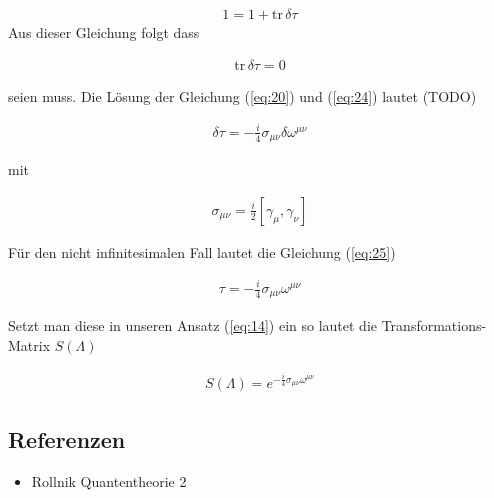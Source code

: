 \begin{align}
  \label{eq:23}
  1 =  1 + \text{tr}\,\delta\tau 
\end{align}
Aus dieser Gleichung folgt dass

\begin{align}
  \label{eq:24}
  \text{tr}\,\delta\tau = 0
\end{align}

seien muss. Die Lösung der Gleichung (\ref{eq:20}) und (\ref{eq:24}) lautet (TODO)

\begin{align}
  \label{eq:25}
  \delta\tau = -\frac{i}{4}\sigma_{\mu\nu}\delta\omega^{\mu\nu}
\end{align}

mit

\begin{align}
  \label{eq:26}
  \sigma_{\mu\nu} = \frac{i}{2}[\gamma_\mu,\gamma_\nu]
\end{align}

Für den nicht infinitesimalen Fall lautet die Gleichung (\ref{eq:25})

\begin{align}
  \label{eq:28}
  \tau = -\frac{i}{4}\sigma_{\mu\nu}\omega^{\mu\nu}
\end{align}

Setzt man diese in unseren Ansatz (\ref{eq:14}) ein so lautet die Transformations-Matrix \(S(\Lambda)\)

\begin{align}
  \label{eq:27}
  S(\Lambda) = e^{-\frac{i}{4}\sigma_{\mu\nu}\omega^{\mu\nu}}
\end{align}


\subsection*{Referenzen}
\begin{itemize}
\item Rollnik Quantentheorie 2
\end{itemize}


